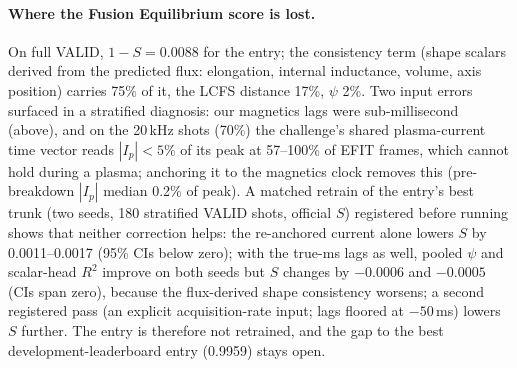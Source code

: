 \documentclass{article}
\begin{document}
\paragraph{Where the Fusion Equilibrium score is lost.} On full VALID, $1-S=0.0088$ for the entry; the consistency
term (shape scalars derived from the predicted flux: elongation, internal inductance, volume, axis position) carries
75\% of it, the LCFS distance 17\%, $\psi$ 2\%. Two input errors surfaced in a stratified diagnosis: our magnetics
lags were sub-millisecond (above), and on the 20\,kHz shots (70\%) the challenge's shared plasma-current time vector
reads $|I_p|<5\%$ of its peak at 57--100\% of EFIT frames, which cannot hold during a plasma; anchoring it to the
magnetics clock removes this (pre-breakdown $|I_p|$ median 0.2\% of peak). A matched retrain of the entry's best trunk
(two seeds, 180 stratified VALID shots, official $S$) registered before running shows that neither correction helps:
the re-anchored current alone lowers $S$ by 0.0011--0.0017 (95\% CIs below zero); with the true-ms lags as well, pooled
$\psi$ and scalar-head $R^2$ improve on both seeds but $S$ changes by $-0.0006$ and $-0.0005$ (CIs span zero), because
the flux-derived shape consistency worsens; a second registered pass (an explicit acquisition-rate input; lags floored at $-50$\,ms) lowers $S$ further. The entry is therefore not retrained, and the gap to the best
development-leaderboard entry (0.9959) stays open.
\end{document}
